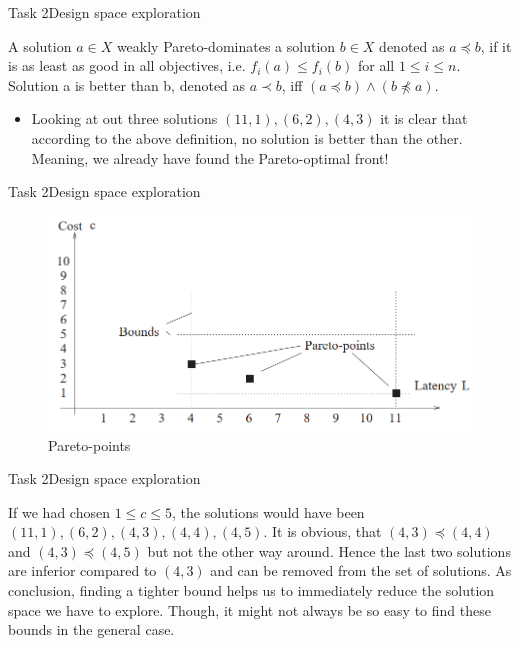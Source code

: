 \begin{frame}{Task 2}{Design space exploration}
    \begin{requirementsnoinc}
     A solution $a \in X$ weakly Pareto-dominates a solution $b \in X$ denoted as $a \preceq b$, if it is as least as good in all objectives, i.e. $f_i(a) \leq f_i(b)$ for all $1 \leq i \leq n$. Solution a is \alert{better} than b, denoted as $a \prec b$, iff $(a \preceq b) \land (b \npreceq a)$.
    \end{requirementsnoinc}
    \begin{solutionnoinc}
        \begin{itemize}
            \item Looking at out three solutions $(11, 1), (6, 2), (4, 3)$ it is clear that according to the above definition, no solution is \alert{better} than the other. Meaning, we already have found the Pareto-optimal front!
        \end{itemize}
    \end{solutionnoinc}
\end{frame}
\begin{frame}{Task 2}{Design space exploration}
    \begin{solution}
     \begin{figure}
         \centering
         \includegraphics[scale=0.3]{figures/Pareto-points.PNG}
         \caption{Pareto-points}
     \end{figure}
    \end{solution}
\end{frame}
\begin{frame}{Task 2}{Design space exploration}
    \begin{Sidenote}
    If we had chosen $1 \leq c \leq 5$, the solutions would have been $(11, 1), (6, 2), (4, 3), (4, 4), (4,5)$. It is obvious, that $(4, 3) \preceq (4, 4)$ and $(4, 3) \preceq (4, 5)$ but not the other way around. Hence the last two solutions are inferior compared to $(4, 3)$ and can be removed from the set of solutions. As conclusion, finding a tighter bound helps us to immediately reduce the solution space we have to explore. Though, it might not always be so easy to find these bounds in the general case.
    \end{Sidenote}
\end{frame}
